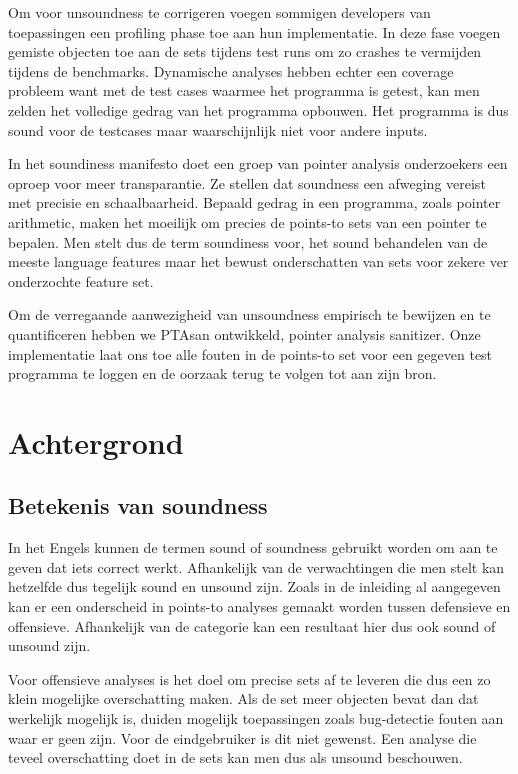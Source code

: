 \documentclass[conference]{IEEEtran}
\begin{document}
Om voor unsoundness te corrigeren voegen sommigen developers van toepassingen een profiling phase toe aan hun implementatie\cite{jin_annotating_2022}\cite{kirth_pkru-safe_2022}.
In deze fase voegen gemiste objecten toe aan de sets tijdens test runs om zo crashes te vermijden tijdens de benchmarks. Dynamische analyses hebben echter een coverage probleem 
want met de test cases waarmee het programma is getest, kan men zelden het volledige gedrag van het programma opbouwen. Het programma is dus sound voor de testcases maar 
waarschijnlijk niet voor andere inputs.

In het soundiness manifesto\cite{livshits_defense_2015} doet een groep van pointer analysis onderzoekers een oproep voor meer 
transparantie. Ze stellen dat soundness een afweging vereist met precisie en schaalbaarheid. Bepaald gedrag in een programma, 
zoals pointer arithmetic, maken het moeilijk om precies de points-to sets van een pointer te bepalen. Men stelt dus de term 
soundiness voor, het sound behandelen van de meeste language features maar het bewust onderschatten van sets voor zekere 
ver onderzochte feature set. 

Om de verregaande aanwezigheid van unsoundness empirisch te bewijzen en te quantificeren hebben we PTAsan ontwikkeld, pointer analysis 
sanitizer. Onze implementatie laat ons toe alle fouten in de points-to set voor een gegeven test programma te loggen en de oorzaak terug 
te volgen tot aan zijn bron. 

\section{Achtergrond}

\subsection{Betekenis van soundness}
In het Engels kunnen de termen sound of soundness gebruikt worden om aan te geven dat iets correct werkt. Afhankelijk van de verwachtingen die men stelt kan hetzelfde dus tegelijk sound en unsound zijn. Zoals in de inleiding al aangegeven kan er een onderscheid in points-to analyses gemaakt worden tussen defensieve en offensieve. Afhankelijk van de categorie kan een resultaat hier dus ook sound of unsound zijn.

Voor offensieve analyses is het doel om precise sets af te leveren die dus een zo klein mogelijke overschatting maken. Als de set meer objecten bevat dan dat werkelijk mogelijk is, duiden mogelijk toepassingen zoals bug-detectie fouten aan waar er geen zijn. Voor de eindgebruiker is dit niet gewenst. Een analyse die teveel overschatting doet in de sets kan men dus als unsound beschouwen.
\end{document}
